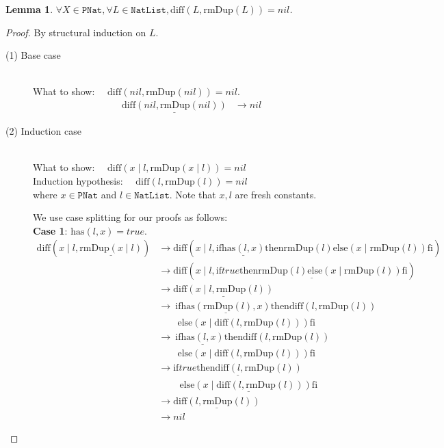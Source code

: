 \documentclass[12pt, a4paper]{article}
\newtheorem{lemma}[theorem]{Lemma}
\newcommand{\rel}[1]{\mathrel{#1}}
\newcommand{\rmx}[1]{\mathrm{#1}}
\newcommand{\larrow}{\longrightarrow}
\newcommand{\under}{\underline}
\begin{document}
\begin{lemma}
\label{lm1}
$\forall X \in \mathtt{PNat}, \forall L \in \mathtt{NatList}, \rmx{diff}(L, \rmx{rmDup}(L)) = nil$.
\end{lemma}
\begin{proof}
By structural induction on $L$.
\begin{description}
\item[(1) Base case]~\\
\noindent
What to show: $\quad \rmx{diff}(nil, \rmx{rmDup}(nil)) = nil$.
\begin{align*}
\under{\rmx{diff}(nil, \rmx{rmDup}(nil))}
	&\larrow nil \tag{by diff1}
\end{align*}
\item[(2) Induction case]~\\
What to show: $\quad \rmx{diff}(x \mid l, \rmx{rmDup}(x \mid l)) = nil$\\
Induction hypothesis: $\quad \rmx{diff}(l, \rmx{rmDup}(l)) = nil$  \\
where $x \in \mathtt{PNat}$ and $l \in \mathtt{NatList}$.
Note that $x, l$ are fresh constants.

We use case splitting for our proofs as follows: \\
\textbf{Case 1}: $\rmx{has}(l, x) = true$.
\begin{align*}
\rmx{diff}(x \mid l, \under{\rmx{rmDup}(x \mid l)})
	&\larrow \rmx{diff}(x \mid l, \rel{\rmx{if}} \under{\rmx{has}(l, x)} \rel{\rmx{then}} \rmx{rmDup}(l) \rel{\rmx{else}} (x \mid \rmx{rmDup}(l)) \rel{\rmx{fi}}) \tag{by rmDup2} \\
	&\larrow \rmx{diff}(x \mid l, \under{\rel{\rmx{if}} true \rel{\rmx{then}} \rmx{rmDup}(l) \rel{\rmx{else}} (x \mid \rmx{rmDup}(l)) \rel{\rmx{fi}}}) \tag{by case splitting} \\	
	&\larrow \under{\rmx{diff}(x \mid l, \rmx{rmDup}(l))} \tag{by if1} \\	
	&\larrow\ \rel{\rmx{if}} \under{\rmx{has}(\rmx{rmDup}(l), x)} \rel{\rmx{then}} \rmx{diff}(l, \rmx{rmDup}(l)) \\
	&\quad \quad \rel{\rmx{else}} ( x \mid \rmx{diff}(l, \rmx{rmDup}(l))) \rel{\rmx{fi}} \tag{by diff2} \\
	&\larrow\ \rel{\rmx{if}} \under{\rmx{has}(l, x)} \rel{\rmx{then}} \rmx{diff}(l, \rmx{rmDup}(l)) \\
	&\quad \quad \rel{\rmx{else}} ( x \mid \rmx{diff}(l, \rmx{rmDup}(l))) \rel{\rmx{fi}} \tag{by Problem 17 - Lemma 1} \\
	&\larrow \under{\rel{\rmx{if}} true \rel{\rmx{then}} \rmx{diff}(l, \rmx{rmDup}(l))} \\
	&\quad \quad\ \under{\rel{\rmx{else}} ( x \mid \rmx{diff}(l, \rmx{rmDup}(l))) \rel{\rmx{fi}}} \tag{by case splitting} \\
	&\larrow \under{\rmx{diff}(l, \rmx{rmDup}(l))} \tag{by if1} \\
	&\larrow nil \tag{by IH}
\end{align*}


\end{description}
\end{proof}
\end{document}
